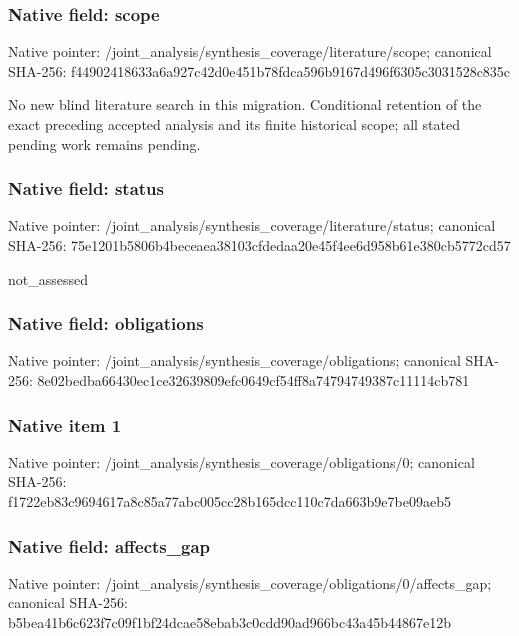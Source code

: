 \documentclass[10pt,a4paper]{article}
\begin{document}
\subsubsection{Native field: scope}
Native pointer: /joint\_\allowbreak{}analysis/synthesis\_\allowbreak{}coverage/literature/scope; canonical SHA-256: f44902418633a6a927c42d0e451b78fdca596b9167d496f6305c3031528c835c

\begingroup\raggedright\sloppy No new blind literature search in this migration. Conditional retention of the exact preceding accepted analysis and its finite historical scope;\allowbreak{} all stated pending work remains pending.\par\endgroup

\subsubsection{Native field: status}
Native pointer: /joint\_\allowbreak{}analysis/synthesis\_\allowbreak{}coverage/literature/status; canonical SHA-256: 75e1201b5806b4beceaea38103cfdedaa20e45f4ee6d958b61e380cb5772cd57

\begingroup\raggedright\sloppy not\_\allowbreak{}assessed\par\endgroup

\subsubsection{Native field: obligations}
Native pointer: /joint\_\allowbreak{}analysis/synthesis\_\allowbreak{}coverage/obligations; canonical SHA-256: 8e02bedba66430ec1ce32639809efc0649cf54ff8a74794749387c11114cb781

\subsubsection{Native item 1}
Native pointer: /joint\_\allowbreak{}analysis/synthesis\_\allowbreak{}coverage/obligations/0; canonical SHA-256: f1722eb83c9694617a8c85a77abc005cc28b165dcc110c7da663b9e7be09aeb5

\subsubsection{Native field: affects\_\allowbreak{}gap}
Native pointer: /joint\_\allowbreak{}analysis/synthesis\_\allowbreak{}coverage/obligations/0/affects\_\allowbreak{}gap; canonical SHA-256: b5bea41b6c623f7c09f1bf24dcae58ebab3c0cdd90ad966bc43a45b44867e12b
\end{document}
